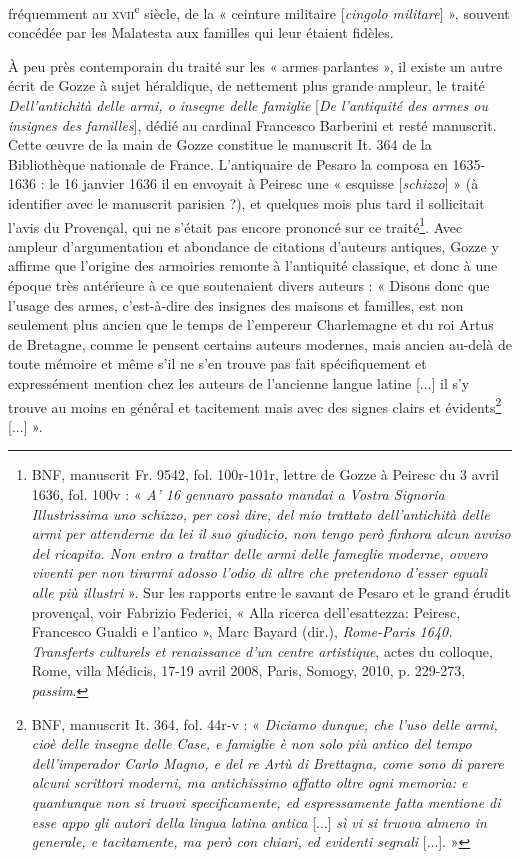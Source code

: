 \documentclass[12pt,twoside,openany]{book}
\begin{document}
fréquemment au \textsc{xvii}\textsuperscript{e} siècle, de la « ceinture militaire [\textit{cingolo militare}] », souvent concédée par les Malatesta aux familles qui leur étaient fidèles.

À peu près contemporain du traité sur les « armes parlantes », il existe un autre écrit de Gozze à sujet héraldique, de nettement plus grande ampleur, le traité \textit{Dell’antichità delle armi, o insegne delle famiglie }[\textit{De l’antiquité des armes ou insignes des familles}], dédié au cardinal Francesco Barberini et resté manuscrit. Cette œuvre de la main de Gozze constitue le manuscrit It. 364 de la Bibliothèque nationale de France. L’antiquaire de Pesaro la composa en 1635-1636 : le 16 janvier 1636 il en envoyait à Peiresc une « esquisse [\textit{schizzo}] » (à identifier avec le manuscrit parisien ?), et quelques mois plus tard il sollicitait l’avis du Provençal, qui ne s’était pas encore prononcé sur ce traité\footnote{BNF, manuscrit Fr. 9542, fol. 100r-101r, lettre de Gozze à Peiresc du 3 avril 1636, fol. 100v : « \textit{A’ 16 gennaro passato mandai a Vostra Signoria Illustrissima uno schizzo, per così dire, del mio trattato dell’antichità delle armi per attenderne da lei il suo giudicio, non tengo però finhora alcun avviso del ricapito. Non entro a trattar delle armi delle fameglie moderne, ovvero viventi per non tirarmi adosso l’odio di altre che pretendono d’esser eguali alle più illustri} ». Sur les rapports entre le savant de Pesaro et le grand érudit provençal, voir Fabrizio Federici, « Alla ricerca dell’esattezza: Peiresc, Francesco Gualdi e l’antico », Marc Bayard (dir.), \textit{Rome-Paris 1640. Transferts culturels et renaissance d’un centre artistique}, actes du colloque, Rome, villa Médicis, 17-19 avril 2008, Paris, Somogy, 2010, p. 229-273, \textit{passim}.}. Avec ampleur d’argumentation et abondance de citations d’auteurs antiques, Gozze y affirme que l’origine des armoiries remonte à l’antiquité classique, et donc à une époque très antérieure à ce que soutenaient divers auteurs : « Disons donc que l’usage des armes, c’est-à-dire des insignes des maisons et familles, est non seulement plus ancien que le temps de l’empereur Charlemagne et du roi Artus de Bretagne, comme le pensent certains auteurs modernes, mais ancien au-delà de toute mémoire et même s’il ne s’en trouve pas fait spécifiquement et expressément mention chez les auteurs de l’ancienne langue latine [...] il s’y trouve au moins en général et tacitement mais avec des signes clairs et évidents\footnote{BNF, manuscrit It. 364, fol. 44r-v : « \textit{Diciamo dunque, che l'uso delle armi, cioè delle insegne delle Case, e famiglie è non solo più antico del tempo dell'imperador Carlo Magno, e del re Artù di Brettagna, come sono di parere alcuni scrittori moderni, ma antichissimo affatto oltre ogni memoria: e quantunque non si truovi specificamente, ed espressamente fatta mentione di esse appo gli autori della lingua latina antica }[...] \textit{sì vi si truova almeno in generale, e tacitamente, ma però con chiari, ed evidenti segnali }[...]. »} [...] ».
\end{document}
